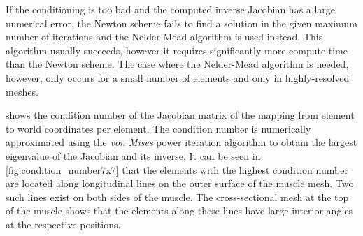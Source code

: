 If the conditioning is too bad and the computed inverse Jacobian has a large numerical error, the Newton scheme fails to find a solution in the given maximum number of iterations and the Nelder-Mead algorithm is used instead. This algorithm usually succeeds, however it requires significantly more compute time than the Newton scheme. The case where the Nelder-Mead algorithm is needed, however, only occurs for a small number of elements and only in highly-resolved meshes.

 shows the condition number of the Jacobian matrix of the mapping from element to world coordinates per element. The condition number is numerically approximated using the \emph{von Mises} power iteration algorithm to obtain the largest eigenvalue of the Jacobian and its inverse.
It can be seen in \cref{fig:condition_number7x7} that the elements with the highest condition number are located along longitudinal lines on the outer surface of the muscle mesh. Two such lines exist on both sides of the muscle. The cross-sectional mesh at the top of the muscle shows that the elements along these lines have large interior angles at the respective positions. 

